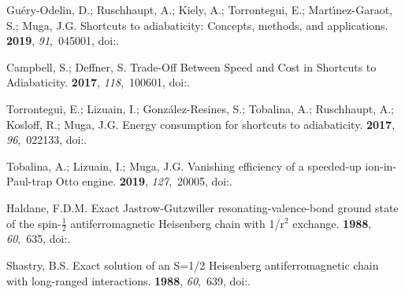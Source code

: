 \documentclass[preprints,article,accept,moreauthors,pdftex]{Definitions/mdpi}
\begin{document}
\begin{thebibliography}{999}
Gu\'ery-Odelin, D.; Ruschhaupt, A.; Kiely, A.; Torrontegui, E.;
  Mart\'{\i}nez-Garaot, S.; Muga, J.G.
\newblock Shortcuts to adiabaticity: Concepts, methods, and applications.
 {\bf 2019}, {\em 91},~045001,
\newblock
  doi:{\href{https://doi.org/10.1103/RevModPhys.91.045001}{}}.

Campbell, S.; Deffner, S.
\newblock Trade-Off Between Speed and Cost in Shortcuts to Adiabaticity.
 {\bf 2017}, {\em 118},~100601,
\newblock
  doi:{\href{https://doi.org/10.1103/PhysRevLett.118.100601}{}}.

Torrontegui, E.; Lizuain, I.; Gonz\'alez-Resines, S.; Tobalina, A.;
  Ruschhaupt, A.; Kosloff, R.; Muga, J.G.
\newblock Energy consumption for shortcuts to adiabaticity.
 {\bf 2017}, {\em 96},~022133,
\newblock
  doi:{\href{https://doi.org/10.1103/PhysRevA.96.022133}{}}.

Tobalina, A.; Lizuain, I.; Muga, J.G.
\newblock Vanishing efficiency of a speeded-up {ion-in-Paul-trap Otto} engine.
 {\bf 2019}, {\em 127},~20005,
\newblock
  doi:{\href{https://doi.org/10.1209/0295-5075/127/20005}{}}.

Haldane, F.D.M.
\newblock Exact {J}astrow-{G}utzwiller resonating-valence-bond ground state of
  the spin-$\frac{1}{2}$ antiferromagnetic {H}eisenberg chain with
  1/${\mathrm{r}}^{2}$ exchange.
 {\bf 1988}, {\em 60},~635,
\newblock
  doi:{\href{https://doi.org/10.1103/PhysRevLett.60.635}{}}.

Shastry, B.S.
\newblock Exact solution of an S=1/2 {H}eisenberg antiferromagnetic chain with
  long-ranged interactions.
 {\bf 1988}, {\em 60},~639,
\newblock
  doi:{\href{https://doi.org/10.1103/PhysRevLett.60.639}{}}.


\end{thebibliography}
\end{document}
